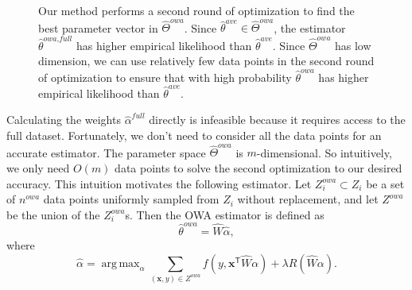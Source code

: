 \documentclass[twoside]{article}
\DeclareMathOperator*{\argmax}{arg\,max}
\newcommand{\Zreopt}{Z^{\textit{owa}}}
\newcommand{\nreopt}{n^{\textit{owa}}}
\newcommand{\matW}{\hat W}
\newcommand{\W}{{\hat \Theta^{\textit{owa}}}}
\newcommand{\E}{\mathbb{E}}
\newcommand{\x}{\mathbf{x}}
\newcommand{\w}{\theta}
\newcommand{\ahat}{\hat\alpha}
\newcommand{\afull}{\ahat^{\textit{full}}}
\newcommand{\wowa}{\hat\w^{owa}}
\newcommand{\wowafull}{\hat\w^{\textit{owa,full}}}
\newcommand{\wave}{\hat\w^{ave}}
\newcommand{\wmle}{\hat\w^{mle}}
\newcommand{\trans}[1]{\ensuremath{{#1}^{\mathsf{T}}}}
\begin{document}
\begin{figure}
\hspace{-0.1in}
\caption{
    Our method performs a second round of optimization to find the best parameter vector in $\W$.
    Since $\wave\in\W$, the estimator $\wowafull$ has higher empirical likelihood than $\wave$.
    Since $\W$ has low dimension, we can use relatively few data points in the second round of optimization to ensure that with high probability $\wowa$ has higher empirical likelihood than $\wave$.
}
\label{fig:contour}
\end{figure}

Calculating the weights $\afull$ directly is infeasible because it requires access to the full dataset.
Fortunately, we don't need to consider all the data points for an accurate estimator.
The parameter space $\W$ is $m$-dimensional.
So intuitively, we only need $O(m)$ data points to solve the second optimization to our desired accuracy.
This intuition motivates the following estimator.
Let $\Zreopt_i\subset Z_i$ be a set of $\nreopt$ data points uniformly sampled from $Z_i$ without replacement,
and let $\Zreopt$ be the union of the $\Zreopt_i$s.
Then the OWA estimator is defined as
\begin{equation}
\wowa = \matW \ahat,
\end{equation}
where
\begin{equation}
\label{eq:ahat}
\ahat = \argmax_\alpha \sum _{(\x,y)\in \Zreopt} f\left(y,\trans\x \matW \alpha \right)
+ \lambda R (\matW\alpha)
.
\end{equation}
\end{document}
